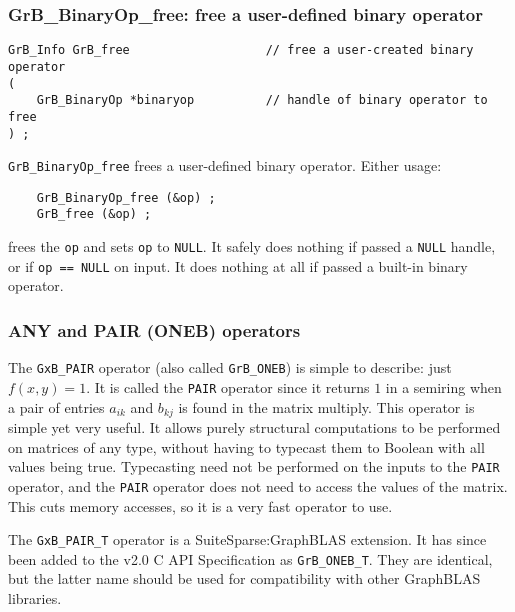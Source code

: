 \documentclass[12pt]{article}
\begin{document}
{\subsubsection{{\sf GrB\_BinaryOp\_free:} free a user-defined binary operator}
\label{binaryop_free}

\begin{mdframed}[userdefinedwidth=6in]
{\footnotesize
\begin{verbatim}
GrB_Info GrB_free                   // free a user-created binary operator
(
    GrB_BinaryOp *binaryop          // handle of binary operator to free
) ;
\end{verbatim}
} \end{mdframed}

\verb'GrB_BinaryOp_free' frees a user-defined binary operator.
Either usage:

    {\small
    \begin{verbatim}
    GrB_BinaryOp_free (&op) ;
    GrB_free (&op) ; \end{verbatim}}

\noindent
frees the \verb'op' and sets \verb'op' to \verb'NULL'.
It safely does nothing if passed a \verb'NULL'
handle, or if \verb'op == NULL' on input.
It does nothing at all if passed a built-in binary operator.

\subsubsection{{\sf ANY} and {\sf PAIR} ({\sf ONEB}) operators}
\label{any_pair}

The \verb'GxB_PAIR' operator (also called \verb'GrB_ONEB') is simple to describe:
just $f(x,y)=1$.  It is called
the \verb'PAIR' operator since it returns $1$ in a semiring when a pair of
entries $a_{ik}$ and $b_{kj}$ is found in the matrix multiply.  This operator
is simple yet very useful.  It allows purely structural computations to be
performed on matrices of any type, without having to typecast them to Boolean
with all values being true.  Typecasting need not be performed on the inputs to
the \verb'PAIR' operator, and the \verb'PAIR' operator does not need to access
the values of the matrix.  This cuts memory accesses, so it is a very fast
operator to use.

The \verb'GxB_PAIR_T' operator is a SuiteSparse:GraphBLAS extension.
It has since been added to the v2.0 C API Specification as \verb'GrB_ONEB_T'.
They are identical, but the latter name should be used for compatibility
with other GraphBLAS libraries.

}
\end{document}
